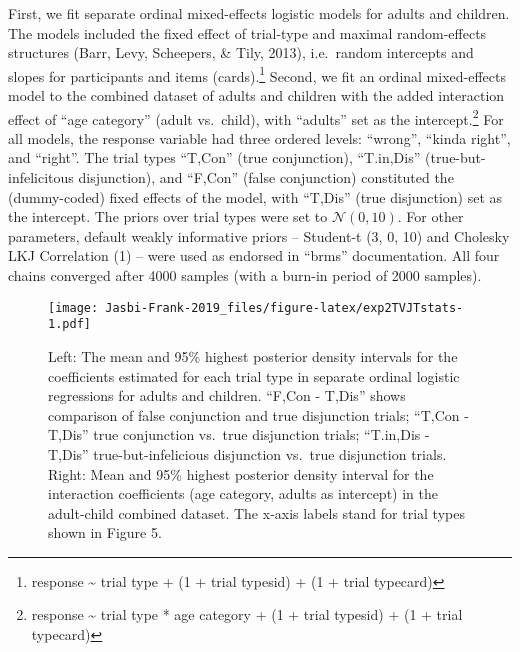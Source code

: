 \documentclass[,man,floatsintext]{apa6}
\let\rmarkdownfootnote\footnote%
\def\footnote{\protect\rmarkdownfootnote}
\begin{document}
First, we fit separate ordinal mixed-effects logistic models for adults and children. The models included the fixed effect of trial-type and maximal random-effects structures (Barr, Levy, Scheepers, \& Tily, 2013), i.e.~random intercepts and slopes for participants and items (cards).\footnote{response \textasciitilde{} trial type + (1 + trial type\textbar{}sid) + (1 + trial type\textbar{}card)} Second, we fit an ordinal mixed-effects model to the combined dataset of adults and children with the added interaction effect of \enquote{age category} (adult vs.~child), with \enquote{adults} set as the intercept.\footnote{response \textasciitilde{} trial type * age category + (1 + trial type\textbar{}sid) + (1 + trial type\textbar{}card)} For all models, the response variable had three ordered levels: \enquote{wrong}, \enquote{kinda right}, and \enquote{right}. The trial types \enquote{T,Con} (true conjunction), \enquote{T.in,Dis} (true-but-infelicitous disjunction), and \enquote{F,Con} (false conjunction) constituted the (dummy-coded) fixed effects of the model, with \enquote{T,Dis} (true disjunction) set as the intercept. The priors over trial types were set to \(\mathcal{N}(0,10)\). For other parameters, default weakly informative priors -- Student-t (3, 0, 10) and Cholesky LKJ Correlation (1) -- were used as endorsed in \enquote{brms} documentation. All four chains converged after 4000 samples (with a burn-in period of 2000 samples).

\begin{figure}
\centering
\texttt{[image: Jasbi-Frank-2019\_files/figure-latex/exp2TVJTstats-1.pdf]}
\caption{\label{fig:exp2TVJTstats}Left: The mean and 95\% highest posterior density intervals for the coefficients estimated for each trial type in separate ordinal logistic regressions for adults and children. \enquote{F,Con - T,Dis} shows comparison of false conjunction and true disjunction trials; \enquote{T,Con - T,Dis} true conjunction vs.~true disjunction trials; \enquote{T.in,Dis - T,Dis} true-but-infelicious disjunction vs.~true disjunction trials. Right: Mean and 95\% highest posterior density interval for the interaction coefficients (age category, adults as intercept) in the adult-child combined dataset. The x-axis labels stand for trial types shown in Figure 5.}
\end{figure}
\end{document}

